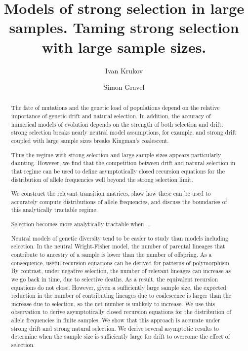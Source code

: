 \documentclass[review]{elsarticle}
\newcommand{\ikcomment}[1]{{\color{blue}{IK: #1}}}
\begin{document}
\begin{frontmatter}
  \title{Models of strong selection in large samples. 
  Taming strong selection with large sample sizes.  }

  \author{Ivan Krukov}
  \author{Simon Gravel}

  \begin{abstract}
  The fate of mutations and the genetic load of populations depend on the relative importance of 
  genetic drift and natural selection. In addition, the accuracy of numerical models of evolution
  depends on the strength of both selection and drift: strong selection breaks nearly neutral model assumptions, 
  for example, and strong drift coupled with large sample sizes breaks Kingman's coalescent. 
  
  Thus the regime with strong selection and large sample sizes appears particularly daunting. 
  However, we find that the competition between drift and natural selection in that regime can
  be used to define asymptotically closed recursion equations for the distribution 
  of allele frequencies well beyond the strong selection limit. 
 
  We construct the relevant transition matrices, show how these can
  be used to accurately compute distributions of allele frequencies, and
  discuss the boundaries of this analytically tractable regime. 
  
  Selection becomes more analytically tractable when ...
    
  \ikcomment{This needs to be re-written}
  
    Neutral models of genetic diversity tend to be easier to study than models including selection.
    In the neutral Wright-Fisher model, the number of parental lineages that contribute to ancestry
    of a sample is lower than the number of offspring. As a consequence, useful recursion equations
    can be derived for patterns of polymorphism. By contrast, under negative selection, the number
    of relevant lineages can increase as we go back in time, due to selective deaths. As a result,
    the equivalent recursion equations do not close. However, given a sufficiently large sample
    size, the expected reduction in the number of contributing lineages due to coalescence is larger
    than the increase due to selection, so the net number is unlikely to increase. We use this
    observation to derive asymptotically closed recursion equations for the distribution of allele
    frequencies in finite samples. We show that this approach is accurate under strong drift and
    strong natural selection. We derive several asymptotic results to determine when the sample size
    is sufficiently large for drift to overcome the effect of selection.
  \end{abstract}

\end{frontmatter}
\end{document}
